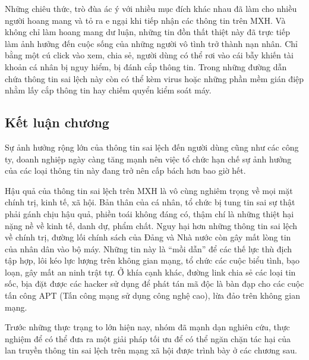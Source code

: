 		Những chiêu thức, trò đùa ác ý với nhiều mục đích khác nhau đã làm cho nhiều người hoang mang và tỏ ra e ngại khi tiếp nhận các thông tin trên MXH. Và không chỉ làm hoang mang dư luận, những tin đồn thất thiệt này đã trực tiếp làm ảnh hưởng đến cuộc sống của những người vô tình trở thành nạn nhân. Chỉ bằng một cú click vào xem, chia sẻ, người dùng có thể rơi vào cái bẫy khiến tài khoản cá nhân bị nguy hiểm, bị đánh cắp thông tin. Trong những đường dẫn chứa thông tin sai lệch này còn có thể kèm virus hoặc những phần mềm gián điệp nhằm lấy cắp thông tin hay chiếm quyển kiểm soát máy.
	\subsection*{Kết luận chương}
	Sự ảnh hưởng rộng lớn của thông tin sai lệch đến người dùng cũng như các công ty, doanh nghiệp ngày càng tăng mạnh nên việc tổ chức hạn chế sự ảnh hưởng của các loại thông tin này đang trở nên cấp bách hơn bao giờ hết. 
	
	Hậu quả của thông tin sai lệch trên MXH là vô cùng nghiêm trọng về mọi mặt chính trị, kinh tế, xã hội. Bản thân của cá nhân, tổ chức bị tung tin sai sự thật phải gánh chịu hậu quả, phiền toái không đáng có, thậm chí là những thiệt hại nặng nề về kinh tế, danh dự, phẩm chất. Nguy hại hơn những thông tin sai lệch về chính trị, đường lối chính sách của Đảng và Nhà nước còn gây mất lòng tin của nhân dân vào bộ máy. Những tin này là “mồi dẫn” để các thế lực thù địch tập hợp, lôi kéo lực lượng trên không gian mạng, tổ chức các cuộc biểu tình, bạo loạn, gây mất an ninh trật tự. Ở khía cạnh khác, đường link chia sẻ các loại tin sốc, bịa đặt được các hacker sử dụng để phát tán mã độc là bàn đạp cho các cuộc tấn công APT (Tấn công mạng sử dụng công nghệ cao), lừa đảo trên không gian mạng.
	
	Trước những thực trạng to lớn hiện nay, nhóm đã mạnh dạn nghiên cứu, thực nghiệm để có thể đưa ra một giải pháp tối ưu để có thể ngăn chặn tác hại của lan truyền thông tin sai lệch trên mạng xã hội được trình bày ở các chương sau.			